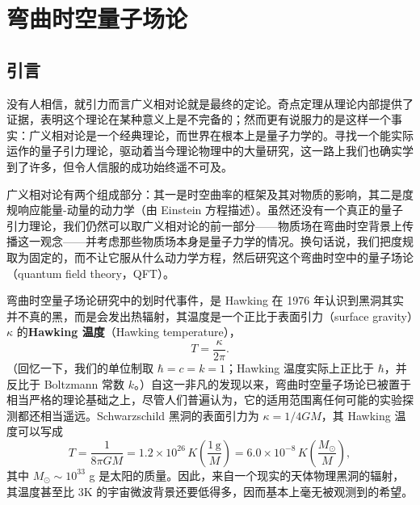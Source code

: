 
\chapter{弯曲时空量子场论}

\section{引言}

没有人相信，就引力而言广义相对论就是最终的定论。奇点定理从理论内部提供了证据，表明这个理论在某种意义上是不完备的；然而更有说服力的是这样一个事实：广义相对论是一个经典理论，而世界在根本上是量子力学的。寻找一个能实际运作的量子引力理论，驱动着当今理论物理中的大量研究，这一路上我们也确实学到了许多，但令人信服的成功始终遥不可及。

广义相对论有两个组成部分：其一是时空曲率的框架及其对物质的影响，其二是度规响应能量-动量的动力学（由 Einstein 方程描述）。虽然还没有一个真正的量子引力理论，我们仍然可以取广义相对论的前一部分——物质场在弯曲时空背景上传播这一观念——并考虑那些物质场本身是量子力学的情况。换句话说，我们把度规取为固定的，而不让它服从什么动力学方程，然后研究这个弯曲时空中的量子场论（quantum field theory，QFT）。

弯曲时空量子场论研究中的划时代事件，是 Hawking 在 1976 年认识到黑洞其实并不真的黑，而是会发出热辐射，其温度是一个正比于表面引力（surface gravity）$\kappa$ 的\textbf{Hawking 温度}（Hawking temperature），
\begin{equation*}
\boxed{\;T = \frac{\kappa}{2\pi}.\;}\tag{9.1}
\end{equation*}
（回忆一下，我们的单位制取 $\hbar = c = k = 1$；Hawking 温度实际上正比于 $\hbar$，并反比于 Boltzmann 常数 $k$。）自这一非凡的发现以来，弯曲时空量子场论已被置于相当严格的理论基础之上，尽管人们普遍认为，它的适用范围离任何可能的实验探测都还相当遥远。Schwarzschild 黑洞的表面引力为 $\kappa = 1/4GM$，其 Hawking 温度可以写成
\begin{equation*}
T = \frac{1}{8\pi GM} = 1.2\times 10^{26}\,K\left(\frac{1\,\mathrm{g}}{M}\right) = 6.0\times 10^{-8}\,K\left(\frac{M_\odot}{M}\right),
\tag{9.2}
\end{equation*}
其中 $M_\odot \sim 10^{33}$ g 是太阳的质量。因此，来自一个现实的天体物理黑洞的辐射，其温度甚至比 3K 的宇宙微波背景还要低得多，因而基本上毫无被观测到的希望。

